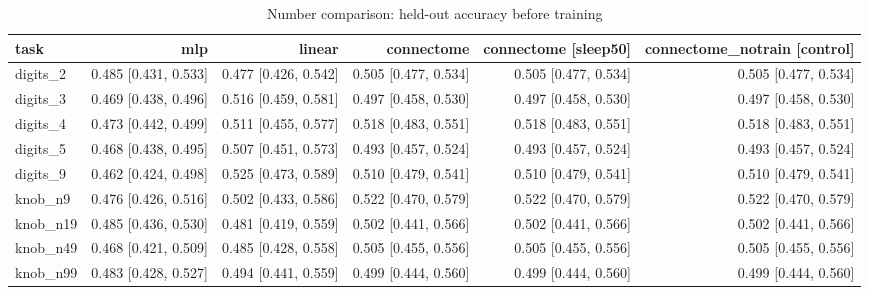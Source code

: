 \begin{table}[t]
\centering
\small
\begin{tabular}{lrrrrr}
\toprule
task & mlp & linear & connectome & connectome [sleep50] & connectome\_notrain [control] \\
\midrule
digits\_2 & 0.485 [0.431, 0.533] & 0.477 [0.426, 0.542] & 0.505 [0.477, 0.534] & 0.505 [0.477, 0.534] & 0.505 [0.477, 0.534] \\
digits\_3 & 0.469 [0.438, 0.496] & 0.516 [0.459, 0.581] & 0.497 [0.458, 0.530] & 0.497 [0.458, 0.530] & 0.497 [0.458, 0.530] \\
digits\_4 & 0.473 [0.442, 0.499] & 0.511 [0.455, 0.577] & 0.518 [0.483, 0.551] & 0.518 [0.483, 0.551] & 0.518 [0.483, 0.551] \\
digits\_5 & 0.468 [0.438, 0.495] & 0.507 [0.451, 0.573] & 0.493 [0.457, 0.524] & 0.493 [0.457, 0.524] & 0.493 [0.457, 0.524] \\
digits\_9 & 0.462 [0.424, 0.498] & 0.525 [0.473, 0.589] & 0.510 [0.479, 0.541] & 0.510 [0.479, 0.541] & 0.510 [0.479, 0.541] \\
knob\_n9 & 0.476 [0.426, 0.516] & 0.502 [0.433, 0.586] & 0.522 [0.470, 0.579] & 0.522 [0.470, 0.579] & 0.522 [0.470, 0.579] \\
knob\_n19 & 0.485 [0.436, 0.530] & 0.481 [0.419, 0.559] & 0.502 [0.441, 0.566] & 0.502 [0.441, 0.566] & 0.502 [0.441, 0.566] \\
knob\_n49 & 0.468 [0.421, 0.509] & 0.485 [0.428, 0.558] & 0.505 [0.455, 0.556] & 0.505 [0.455, 0.556] & 0.505 [0.455, 0.556] \\
knob\_n99 & 0.483 [0.428, 0.527] & 0.494 [0.441, 0.559] & 0.499 [0.444, 0.560] & 0.499 [0.444, 0.560] & 0.499 [0.444, 0.560] \\
\bottomrule
\end{tabular}
\caption{Number comparison: held-out accuracy before training}
\label{tab:comparison_pre_acc}
\end{table}